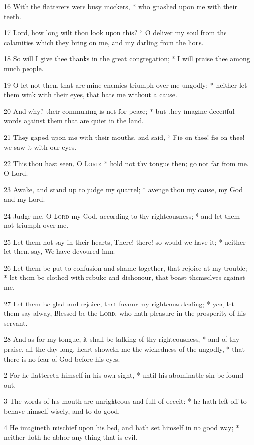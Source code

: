 16 With the flatterers were busy mockers, * who gnashed upon me with their teeth.\par
17 Lord, how long wilt thou look upon this? * O deliver my soul from the calamities which they bring on me, and my darling from the lions.\par
18 So will I give thee thanks in the great congregation; * I will praise thee among much people.\par
19 O let not them that are mine enemies triumph over me ungodly; * neither let them wink with their eyes, that hate me without a cause.\par
20 And why? their communing is not for peace; * but they imagine deceitful words against them that are quiet in the land.\par
21 They gaped upon me with their mouths, and said, * Fie on thee! fie on thee! we saw it with our eyes.\par
22 This thou hast seen, O {\textsc{Lord}}; * hold not thy tongue then; go not far from me, O Lord.\par
23 Awake, and stand up to judge my quarrel; * avenge thou my cause, my God and my Lord.\par
24 Judge me, O {\textsc{Lord}} my God, according to thy righteousness; * and let them not triumph over me.\par
25 Let them not say in their hearts, There! there! so would we have it; * neither let them say, We have devoured him.\par
26 Let them be put to confusion and shame together, that rejoice at my trouble; * let them be clothed with rebuke and dishonour, that boast themselves against me.\par
27 Let them be glad and rejoice, that favour my righteous dealing; * yea, let them say alway, Blessed be the {\textsc{Lord}}, who hath pleasure in the prosperity of his servant.\par
28 And as for my tongue, it shall be talking of thy righteousness, * and of thy praise, all the day long.
 heart showeth me the wickedness of the ungodly, * that there is no fear of God before his eyes.\par
2 For he flattereth himself in his own sight, * until his abominable sin be found out.\par
3 The words of his mouth are unrighteous and full of deceit: * he hath left off to behave himself wisely, and to do good.\par
4 He imagineth mischief upon his bed, and hath set himself in no good way; * neither doth he abhor any thing that is evil.\par
